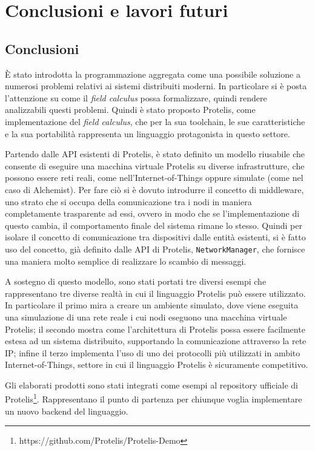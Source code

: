 \chapter{Conclusioni e lavori futuri}
\section{Conclusioni}
È stato introdotta la programmazione aggregata come una possibile soluzione a
numerosi problemi relativi ai sistemi distribuiti moderni. In particolare si è
posta l'attenzione su come il \textit{field calculus} possa formalizzare, quindi
rendere analizzabili questi problemi. Quindi è stato proposto Protelis, come
implementazione del \textit{field calculus}, che per la sua toolchain, le sue
caratteristiche e la sua portabilità rappresenta un linguaggio protagonista in
questo settore.

Partendo dalle API esistenti di Protelis, è stato definito un modello riusabile
che consente di eseguire una macchina virtuale Protelis su diverse
infrastrutture, che possono essere reti reali, come nell'Internet-of-Things
oppure simulate (come nel caso di Alchemist).  Per fare ciò si è dovuto
introdurre il concetto di middleware, uno strato che si occupa della
comunicazione tra i nodi in maniera completamente trasparente ad essi, ovvero in
modo che se l'implementazione di questo cambia, il comportamento finale del
sistema rimane lo stesso. Quindi per isolare il concetto di comunicazione tra
dispositivi dalle entità esistenti, si è fatto uso del concetto, già definito
dalle API di Protelis, \texttt{NetworkManager}, che fornisce una maniera molto
semplice di realizzare lo scambio di messaggi.

A sostegno di questo modello, sono stati portati tre diversi esempi che
rappresentano tre diverse realtà in cui il linguaggio Protelis può essere
utilizzato. In particolare il primo mira a creare un ambiente simulato, dove
viene eseguita una simulazione di una rete reale i cui nodi eseguono una
macchina virtuale Protelis; il secondo mostra come l'architettura di Protelis
possa essere facilmente estesa ad un sistema distribuito, supportando la
comunicazione attraverso la rete IP; infine il terzo implementa l'uso di uno dei
protocolli più utilizzati in ambito Internet-of-Things, settore in cui il
linguaggio Protelis è sicuramente competitivo.

Gli elaborati prodotti sono stati integrati come esempi al repository ufficiale
di Protelis\footnote{https://github.com/Protelis/Protelis-Demo}. Rappresentano
il punto di partenza per chiunque voglia implementare un nuovo backend del
linguaggio.

